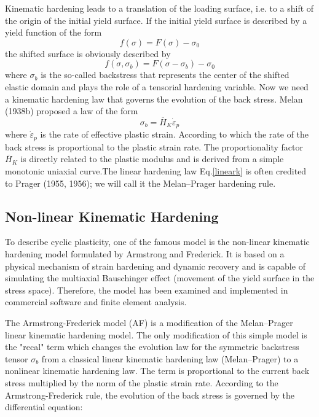 \documentclass[3p,times,procedia,number]{elsarticle}
\begin{document}
Kinematic hardening leads to a translation of the loading surface, i.e. to a shift of
the origin of the initial yield surface. If the initial yield surface is described by a yield
function of the form
$$f(\sigma) = F(\sigma) -\sigma_0 $$
the shifted surface is obviously described by
$$f(\sigma,\sigma_b ) = F(\sigma-\sigma_b ) -\sigma_0$$
where $\sigma_b$ is the so-called backstress that represents the center of the shifted elastic
domain and plays the role of a tensorial hardening variable. Now we need a kinematic
hardening law that governs the evolution of the back stress. Melan (1938b) proposed
a law of the form
\begin{equation}
\sigma_b =\overline{H}_K \dot{\varepsilon}_p
\label{lineark}
\end{equation}
where $ \dot{\varepsilon}_p$ is the rate of effective plastic strain. According to which the rate of the back stress is proportional to the plastic strain rate.
The proportionality factor $\overline{H}_K$ is directly related to the plastic modulus and is derived from a simple
monotonic uniaxial curve.The linear hardening law Eq.\eqref{lineark} is often credited to Prager (1955, 1956); we will call it the Melan–Prager hardening rule. 

\subsection{Non-linear Kinematic Hardening}
To describe cyclic plasticity, one of the famous model is the non-linear kinematic hardening model formulated by Armstrong and Frederick. It is based on a physical mechanism of strain hardening and dynamic recovery and is capable of simulating the
multiaxial Bauschinger effect (movement of the yield surface in the stress space). Therefore, the model has been examined and implemented in commercial software and finite element analysis.

The Armstrong-Frederick model (AF) is a modification of the Melan–Prager linear kinematic hardening model. The only modification of this simple model is the "recal" term which changes the evolution law for the symmetric backstress tensor $\sigma_b$ from a classical linear kinematic hardening law (Melan–Prager) to a nonlinear kinematic hardening law. The term is proportional to the current back stress multiplied by the norm of the plastic strain rate. According to the Armstrong-Frederick rule, the evolution of the
back stress is governed by the differential equation:
\end{document}
